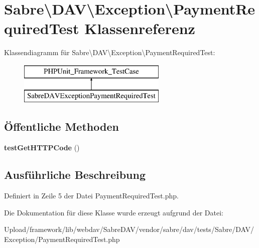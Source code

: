 \hypertarget{class_sabre_1_1_d_a_v_1_1_exception_1_1_payment_required_test}{}\section{Sabre\textbackslash{}D\+AV\textbackslash{}Exception\textbackslash{}Payment\+Required\+Test Klassenreferenz}
\label{class_sabre_1_1_d_a_v_1_1_exception_1_1_payment_required_test}
Klassendiagramm für Sabre\textbackslash{}D\+AV\textbackslash{}Exception\textbackslash{}Payment\+Required\+Test\+:\begin{figure}[H]
\begin{center}
\leavevmode
\includegraphics[height=2.000000cm]{class_sabre_1_1_d_a_v_1_1_exception_1_1_payment_required_test}
\end{center}
\end{figure}
\subsection*{Öffentliche Methoden}
\begin{DoxyCompactItemize}
\item 
\mbox{\label{class_sabre_1_1_d_a_v_1_1_exception_1_1_payment_required_test_a5f9c8a5e563b9e7143f14dc4658a3b47}} 
{\bfseries test\+Get\+H\+T\+T\+P\+Code} ()
\end{DoxyCompactItemize}


\subsection{Ausführliche Beschreibung}


Definiert in Zeile 5 der Datei Payment\+Required\+Test.\+php.



Die Dokumentation für diese Klasse wurde erzeugt aufgrund der Datei\+:\begin{DoxyCompactItemize}
\item 
Upload/framework/lib/webdav/\+Sabre\+D\+A\+V/vendor/sabre/dav/tests/\+Sabre/\+D\+A\+V/\+Exception/Payment\+Required\+Test.\+php\end{DoxyCompactItemize}
